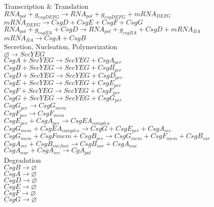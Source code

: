 \documentclass[11pt, oneside]{article}   	%
\begin{document}
\begin{center}

Transcription \& Translation \\
$RNA_{pol} + g_{csgDEFG} \rightarrow RNA_{pol} + g_{csgDEFG} + mRNA_{DEFG}$ \\
$mRNA_{DEFG} \rightarrow CsgD + CsgE + CsgF + CsgG$ \\
$RNA_{pol} + g_{csgBA} + CsgD \rightarrow RNA_{pol} + g_{csgBA} + CsgD + mRNA_{BA} $ \\
$mRNA_{BA} \rightarrow CsgA + CsgB$ \\ 
\hfill \break
Secretion, Nucleation, Polymerization \\
$\varnothing \rightarrow SecYEG$ \\
$CsgA + SecYEG \rightarrow SecYEG + CsgA_{per}$ \\
$CsgB + SecYEG \rightarrow SecYEG + CsgB_{per}$ \\
$CsgD + SecYEG \rightarrow SecYEG + CsgD_{per}$ \\
$CsgE + SecYEG \rightarrow SecYEG + CsgE_{per}$ \\
$CsgF + SecYEG \rightarrow SecYEG + CsgF_{per}$ \\
$CsgG + SecYEG \rightarrow SecYEG + CsgG_{per}$ \\
$CsgG_{per} \rightarrow CsgG_{mem}$ \\
$CsgF_{per} \rightarrow CsgF_{mem}$ \\
$CsgE_{per} + CsgA_{per} \rightarrow CsgEA_{complex}$ \\
$CsgG_{mem} + CsgEA_{complex} \rightarrow CsgG + CsgE_{per} + CsgA_{sec}$ \\
$CsgG_{mem} + CsgF{mem} + CsgB_{per} \rightarrow CsgG_{mem} + CsgF_{mem} + CsgB_{sur}$ \\
$CsgA_{sec} + CsgB_{surface} \rightarrow CsgB_{sur} + CsgA_{nuc}$ \\ 
$CsgA_{nuc} + CsgA_{sec} \rightarrow CgA_{pol}$ \\

\hfill \break
Degradation \\
$CsgB \rightarrow \varnothing$ \\ 
$CsgA \rightarrow \varnothing$ \\
$CsgD \rightarrow \varnothing$ \\
$CsgE \rightarrow \varnothing$ \\
$CsgF \rightarrow \varnothing$ \\
$CsgG \rightarrow \varnothing$ \\


\end{center}
\end{document}
